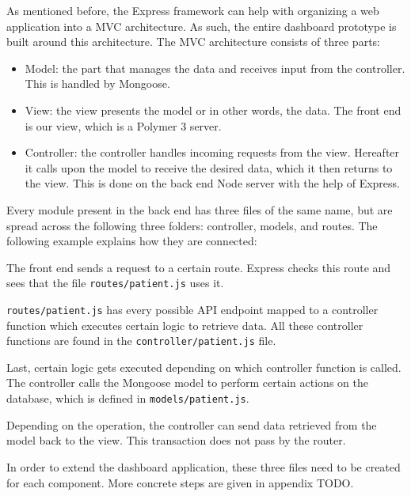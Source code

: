         As mentioned before, the Express framework can help with organizing a web application into a MVC architecture. As such, the entire dashboard prototype is built around this architecture. The MVC architecture consists of three parts:
        \begin{itemize}
            \item Model: the part that manages the data and receives input from the controller. This is handled by Mongoose.
            \item View: the view presents the model or in other words, the data. The front end is our view, which is a Polymer 3 server.
            \item Controller: the controller handles incoming requests from the view. Hereafter it calls upon the model to receive the desired data, which it then returns to the view. This is done on the back end Node server with the help of Express.
        \end{itemize}

        \noindent Every module present in the back end has three files of the same name, but are spread across the following three folders: controller, models, and routes. The following example explains how they are connected:
        \begin{myenumerate}
            \item The front end sends a request to a certain route. Express checks this route and sees that the file \texttt{routes/patient.js} uses it. 
            \item \texttt{routes/patient.js} has every possible API endpoint mapped to a controller function which executes certain logic to retrieve data. All these controller functions are found in the \texttt{controller/patient.js} file.
            \item Last, certain logic gets executed depending on which controller function is called. The controller calls the Mongoose model to perform certain actions on the database, which is defined in \texttt{models/patient.js}.
            \item Depending on the operation, the controller can send data retrieved from the model back to the view. This transaction does not pass by the router.
        \end{myenumerate}

        \noindent In order to extend the dashboard application, these three files need to be created for each component. More concrete steps are given in appendix TODO.

